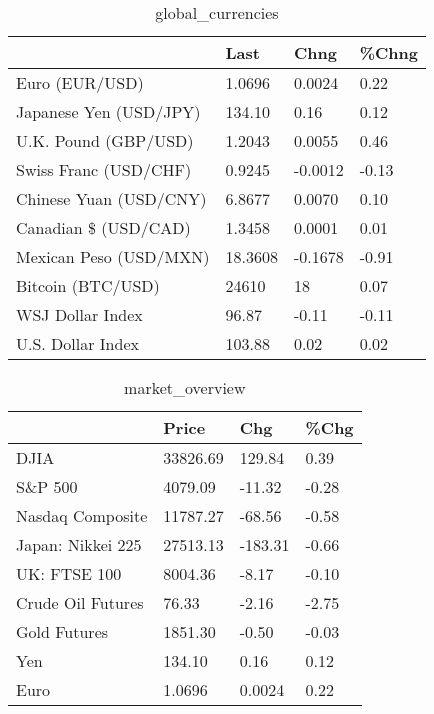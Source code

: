 \documentclass{article}%
\begin{document}
%


\begin{table}[htbp]%
\caption{global\_currencies}%
\centering%
\begin{adjustbox}{width=1\textwidth}%
\begin{tabular}{llll}
\toprule
                       &    Last &    Chng & \%Chng \\
\midrule
        Euro (EUR/USD) &  1.0696 &  0.0024 &  0.22 \\
Japanese Yen (USD/JPY) &  134.10 &    0.16 &  0.12 \\
  U.K. Pound (GBP/USD) &  1.2043 &  0.0055 &  0.46 \\
 Swiss Franc (USD/CHF) &  0.9245 & -0.0012 & -0.13 \\
Chinese Yuan (USD/CNY) &  6.8677 &  0.0070 &  0.10 \\
  Canadian \$ (USD/CAD) &  1.3458 &  0.0001 &  0.01 \\
Mexican Peso (USD/MXN) & 18.3608 & -0.1678 & -0.91 \\
     Bitcoin (BTC/USD) &   24610 &      18 &  0.07 \\
      WSJ Dollar Index &   96.87 &   -0.11 & -0.11 \\
     U.S. Dollar Index &  103.88 &    0.02 &  0.02 \\
\bottomrule
\end{tabular}
%
\end{adjustbox}%
\end{table}

%


\begin{table}[htbp]%
\caption{market\_overview}%
\centering%
\begin{adjustbox}{width=1\textwidth}%
\begin{tabular}{llll}
\toprule
                  &    Price &     Chg &  \%Chg \\
\midrule
             DJIA & 33826.69 &  129.84 &  0.39 \\
          S\&P 500 &  4079.09 &  -11.32 & -0.28 \\
 Nasdaq Composite & 11787.27 &  -68.56 & -0.58 \\
Japan: Nikkei 225 & 27513.13 & -183.31 & -0.66 \\
     UK: FTSE 100 &  8004.36 &   -8.17 & -0.10 \\
Crude Oil Futures &    76.33 &   -2.16 & -2.75 \\
     Gold Futures &  1851.30 &   -0.50 & -0.03 \\
              Yen &   134.10 &    0.16 &  0.12 \\
             Euro &   1.0696 &  0.0024 &  0.22 \\
\bottomrule
\end{tabular}
%
\end{adjustbox}%
\end{table}

%
\end{document}
